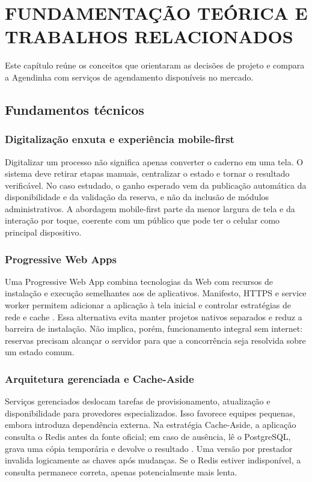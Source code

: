 \section{FUNDAMENTAÇÃO TEÓRICA E TRABALHOS RELACIONADOS}

Este capítulo reúne os conceitos que orientaram as decisões de projeto e compara a Agendinha com serviços de agendamento disponíveis no mercado.

\subsection{Fundamentos técnicos}

\subsubsection{Digitalização enxuta e experiência mobile-first}

Digitalizar um processo não significa apenas converter o caderno em uma tela. O sistema deve retirar etapas manuais, centralizar o estado e tornar o resultado verificável. No caso estudado, o ganho esperado vem da publicação automática da disponibilidade e da validação da reserva, e não da inclusão de módulos administrativos. A abordagem mobile-first parte da menor largura de tela e da interação por toque, coerente com um público que pode ter o celular como principal dispositivo.

\subsubsection{Progressive Web Apps}

Uma Progressive Web App combina tecnologias da Web com recursos de instalação e execução semelhantes aos de aplicativos. Manifesto, HTTPS e service worker permitem adicionar a aplicação à tela inicial e controlar estratégias de rede e cache \cite{mdnpwa,w3cmanifest}. Essa alternativa evita manter projetos nativos separados e reduz a barreira de instalação. Não implica, porém, funcionamento integral sem internet: reservas precisam alcançar o servidor para que a concorrência seja resolvida sobre um estado comum.

\subsubsection{Arquitetura gerenciada e Cache-Aside}

Serviços gerenciados deslocam tarefas de provisionamento, atualização e disponibilidade para provedores especializados. Isso favorece equipes pequenas, embora introduza dependência externa. Na estratégia Cache-Aside, a aplicação consulta o Redis antes da fonte oficial; em caso de ausência, lê o PostgreSQL, grava uma cópia temporária e devolve o resultado \cite{fowler2002}. Uma versão por prestador invalida logicamente as chaves após mudanças. Se o Redis estiver indisponível, a consulta permanece correta, apenas potencialmente mais lenta.

